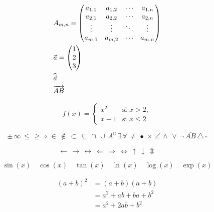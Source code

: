 \begin{center}
\begin{align*}\centering
        &    A_{m,n} = 
            \begin{pmatrix}
                a_{1,1} & a_{1,2} & \cdots & a_{1,n} \\
                a_{2,1} & a_{2,2} & \cdots & a_{2,n} \\
                \vdots  & \vdots  & \ddots & \vdots  \\
                a_{m,1} & a_{m,2} & \cdots & a_{m,n} 
            \end{pmatrix}\\
        &\vec{a} =
            \begin{pmatrix} 
                1\\2\\3 
            \end{pmatrix}\\
        &\widehat{\vec{a}}\\
        &\overrightarrow{AB}
\end{align*}

\begin{equation*}
	f(x) = \begin{cases}
	x^2 & \text{si } x>2,\\
	x-1 & \text{si } x\leq 2
	\end{cases}
\end{equation*}

\begin{equation*}
\pm \, \infty \, \leq \, \geq \, \circ \, \in \, \notin \, \subset \, \subseteq \, \cap \, \cup \, A^\complement \, \exists \, \forall \, \neq \, \bullet  \, \times \, \angle \, \land \, \lor \, \neg \, \overline{AB} \, \triangle \, \square
\end{equation*}

\begin{equation*}
\leftarrow \, \rightarrow \, \leftrightarrow \, \Leftarrow \, \Rightarrow \, \Leftrightarrow \, \uparrow \, \downarrow \, \Updownarrow
\end{equation*}

\begin{equation*}
	\sin(x) \quad \cos(x) \quad \tan(x) \quad \ln(x) \quad \log(x) \quad \exp(x)
\end{equation*}

\begin{align*}
	(a+b)^2 &= (a+b)(a+b)\\
	&= a^2+ab+ba+b^2\\
	&=a^2+2ab+b^2
\end{align*}


\end{center}
